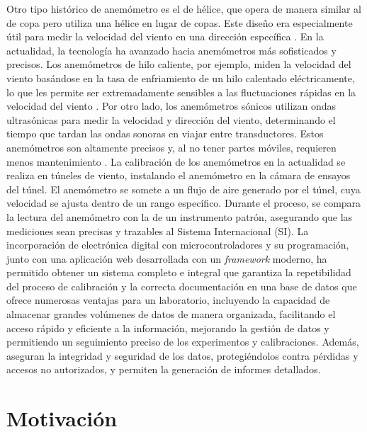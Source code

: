 Otro tipo histórico de anemómetro es el de hélice, que opera de manera similar al de copa pero utiliza una hélice en lugar de copas. Este diseño era especialmente útil para medir la velocidad del viento en una dirección específica \cite{robinson1846}. En la actualidad, la tecnología ha avanzado hacia anemómetros más sofisticados y precisos. Los anemómetros de hilo caliente, por ejemplo, miden la velocidad del viento basándose en la tasa de enfriamiento de un hilo calentado eléctricamente, lo que les permite ser extremadamente sensibles a las fluctuaciones rápidas en la velocidad del viento \cite{hot_wire_anemometers}. Por otro lado, los anemómetros sónicos utilizan ondas ultrasónicas para medir la velocidad y dirección del viento, determinando el tiempo que tardan las ondas sonoras en viajar entre transductores. Estos anemómetros son altamente precisos y, al no tener partes móviles, requieren menos mantenimiento \cite{sonic_anemometers}. La calibración de los anemómetros en la actualidad se realiza en túneles de viento, instalando el anemómetro en la cámara de ensayos del túnel. El anemómetro se somete a un flujo de aire generado por el túnel, cuya velocidad se ajusta dentro de un rango específico. Durante el proceso, se compara la lectura del anemómetro con la de un instrumento patrón, asegurando que las mediciones sean precisas y trazables al Sistema Internacional (SI). La incorporación de electrónica digital con microcontroladores y su programación, junto con una aplicación web desarrollada con un \textit{framework} moderno, ha permitido obtener un sistema completo e integral que garantiza la repetibilidad del proceso de calibración y la correcta documentación en una base de datos que ofrece numerosas ventajas para un laboratorio, incluyendo la capacidad de almacenar grandes volúmenes de datos de manera organizada, facilitando el acceso rápido y eficiente a la información, mejorando la gestión de datos y permitiendo un seguimiento preciso de los experimentos y calibraciones. Además, aseguran la integridad y seguridad de los datos, protegiéndolos contra pérdidas y accesos no autorizados, y permiten la generación de informes detallados.


\section{Motivación}\label{sec:motivacion}


